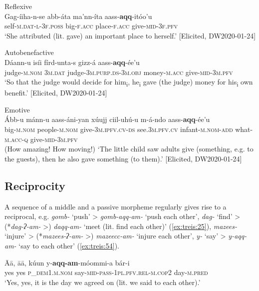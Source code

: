 \documentclass[output=paper]{langscibook}
\begin{document}
\ea\label{ex:treis:51} Reflexive\\
\gll Gag-íiha-n-se abb-áta ma’nn-íta aass-\textbf{aqq}-itóo’u\\
     self-\textsc{m.dat-l-3f.poss} big-\textsc{f.acc} place-\textsc{f.acc} give-\textsc{mid-3f.pfv}\\
\glt ‘She attributed (lit. gave) an important place to herself.’ [Elicited, DW2020-01-24]\z

\ea\label{ex:treis:52} Autobenefactive\\
\gll Dáann-u isíi fírd-unta-s gizz-á aass-\textbf{aqq}{}-ée’u\\
     judge-\textsc{m.nom} \textsc{3m.dat} judge-\textsc{3m.purp.ds-3m.obj} money-\textsc{m.acc} give-\textsc{mid-3m.pfv}\\
\glt ‘So that the judge would decide for him\textsubscript{i}, he\textsubscript{i} gave (the judge) money for his\textsubscript{i} own benefit.’ [Elicited, DW2020-01-24]\z

\ea\label{ex:treis:53} Emotive\\
\gll Ább-u mánn-u aass-áni-yan xúujj ciil-uhú-u m-á-ndo aass-\textbf{aqq}-ée’u \\
     big-\textsc{m.nom} people-\textsc{m.nom} give-\textsc{3m.ipfv.cv-ds} see.\textsc{3m.pfv.cv} infant-\textsc{m.nom-add} what-\textsc{m.acc-q} give-\textsc{mid-3m.pfv}\\
\glt (How amazing! How moving!) ‘The little child saw adults give (something, e.g. to the guests), then he also gave something (to them).’ [Elicited, DW2020-01-24]\z

\subsection{Reciprocity}\label{sec:treis:4.4}

A sequence of a middle and a passive morpheme regularly gives rise to a reciprocal, e.g. \textit{gomb-} ‘push’ > \textit{gomb-aqq-am-} ‘push each other’, \textit{dag-} ‘find’ > (*\textit{dag-ʔ-am-} >) \textit{daqq-am-} ‘meet (lit. find each other)’ (\ref{ex:treis:25}), \textit{mazees-} ‘injure’ > (*\textit{mazees-ʔ-am-} >) \textit{mazeecc-am-} ‘injure each other’, \textit{y-} ‘say’ > \textit{y-aqq-am-} ‘say to each other’ (\ref{ex:treis:54}).

\ea\label{ex:treis:54} 
\gll \MakeUppercase{ā}ā, āā, kúun y-\textbf{aqq-am}-móommi-a bár-i\\
     yes yes \textsc{p\_dem1.m.nom} say-\textsc{mid-pass-1pl.pfv.rel-m.cop2} day-\textsc{m.pred}\\
\glt ‘Yes, yes, it is the day we agreed on (lit. we said to each other).’ \citep[83]{Saint-Exupéry2018}\z
\end{document}
